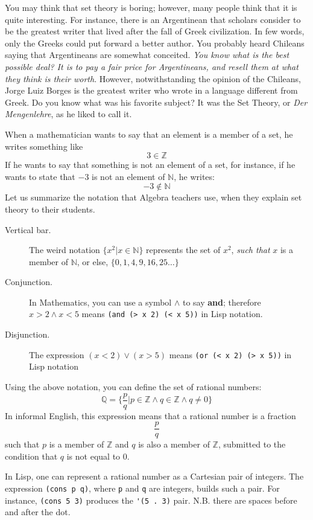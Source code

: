 \documentclass[a4paper,12pt]{book}
\begin{document}
You may think that set theory is boring; however, many people think that it is quite interesting. For instance, there is an Argentinean that scholars consider to be the greatest writer that lived after the fall of Greek civilization. In few words, only the Greeks could put forward a better author. You probably heard Chileans saying  that Argentineans are somewhat conceited. {\em You know what is the best possible deal? It is to pay a fair price for Argentineans, and resell them at what they think is their worth}. However, notwithstanding the opinion of the Chileans, Jorge Luiz Borges is the greatest writer who wrote in a language different from Greek.
Do you know what was his favorite subject? It was the Set Theory, or {\em Der Mengenlehre}, as he liked to call it.

When a mathematician wants to say that an element is a member of a set, he writes something like
$$3  \in \mathbb{Z}$$
If he wants to say that something is not an element of a set, for instance, if he wants to state that $-3$ is not an element of $\mathbb{N}$, he writes:
$$-3  \notin  \mathbb{N}$$
Let us summarize the notation that Algebra teachers use, when they explain set theory to their students.
\begin{description}
\item[Vertical bar.] The weird notation $\{x^2 | x \in \mathbb{N}\}$
represents the set of
$x^2$, {\em such that} $x$ is a member of $\mathbb{N}$, or else,
$\{0, 1, 4, 9, 16, 25\ldots\}$
\item[Conjunction.] In Mathematics, you can use a symbol $\wedge$
to say {\bf\small and}; therefore $x>2 \wedge x<5$ means 
\verb|(and (> x 2) (< x 5))| in Lisp notation.
\item[Disjunction.] The expression
$(x<2) \vee (x>5)$
means \verb|(or (< x 2) (> x 5))| in Lisp notation
\end{description}
Using the above notation, you can define the set of rational numbers:
$$\mathbb{Q}=\{\frac{p}{q} | p \in \mathbb{Z} \wedge q \in \mathbb{Z} 
\wedge q \neq 0\}$$
In informal English, this expression means that a rational number is a fraction $$\frac{p}{q}$$ such that $p$ is a member of $\mathbb{Z}$ and $q$ is also a member of $\mathbb{Z}$, submitted to the condition that $q$ is not equal to $0$.

In Lisp, one can represent a rational number
as a Cartesian pair of integers. The expression \verb|(cons p q)|,
where \verb|p| and \verb|q| are integers, builds such a pair.
For instance, \verb|(cons 5 3)| produces the
\verb|'(5 . 3)| pair. N.B. there
are spaces before and after the dot.\label{page:cartesian-pair}
\end{document}
